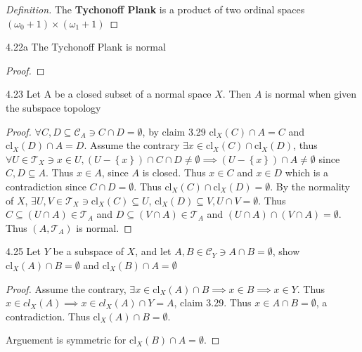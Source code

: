 \documentclass{article}
\newcommand*{\T}{\mathcal{T}}
\newcommand*{\cl}{\mathrm{cl}}
\newenvironment{definition}
{\renewcommand\qedsymbol{$\blacksquare$}\begin{proof}[Definition]}
{\end{proof}}
\begin{document}
\bigskip


\begin{definition}
    The \textbf{Tychonoff Plank} is a product of two ordinal spaces $(\omega_0 + 1) \times (\omega_1 + 1)$ 
\end{definition}

\begin{claim}{4.22a}\label{Claim 4.22a.}
    The Tychonoff Plank is normal 
\end{claim}
\begin{proof}
    
\end{proof}

\bigskip

\begin{claim}{4.23}\label{Claim 4.23.}
    Let A be a closed subset of a normal space $X$. Then $A$ is normal when given the subspace topology  
\end{claim}
\begin{proof}
    $\forall C, D \subseteq \mathcal{C}_A \ni C \cap D = \emptyset$, by claim 3.29 $\cl_X(C) \cap A = C$ and $\cl_X(D) \cap A = D$. Assume the contrary $\exists x \in \cl_X(C) \cap \cl_X(D)$, thus $\forall U \in \T_X \ni x \in U, \left(U - \left\{ x \right\}\right) \cap C \cap D \neq \emptyset \implies \left(U - \left\{ x \right\}\right) \cap A \neq \emptyset$ since $C, D \subseteq A$. Thus $x \in A$, since $A$ is closed. Thus $x \in C$ and $x \in D$ which is a contradiction since $C \cap D =\emptyset$. Thus $\cl_X(C) \cap \cl_X(D) = \emptyset$. By the normality of $X$, $\exists U, V \in \T_X \ni \cl_X(C) \subseteq U$, $\cl_X(D) \subseteq V, U \cap V = \emptyset$. Thus $C \subseteq (U \cap A) \in \T_A$ and $D \subseteq (V \cap A) \in \T_A$ and $(U \cap A) \cap (V \cap A) = \emptyset$. Thus $(A, \T_A)$ is normal.                    
\end{proof}

\bigskip

\begin{PROB}{4.25}\label{Problem 4.25.}
    Let $Y$ be a subspace of $X$, and let $A, B \in \mathcal{C}_Y \ni A \cap B = \emptyset$, show $\cl_X(A) \cap B = \emptyset$ and $\cl_X(B) \cap A = \emptyset$     
\end{PROB}
\begin{proof}
    Assume the contrary, $\exists x \in \cl_X(A) \cap B \implies x \in B \implies x \in Y$. Thus $x \in cl_X(A) \implies x \in cl_X(A) \cap Y = A$, claim 3.29. Thus $x \in A \cap B = \emptyset$, a contradiction. Thus $\cl_X(A) \cap B = \emptyset$.
    
    Arguement is symmetric for $\cl_X(B) \cap A = \emptyset$.  
\end{proof}
\end{document}
